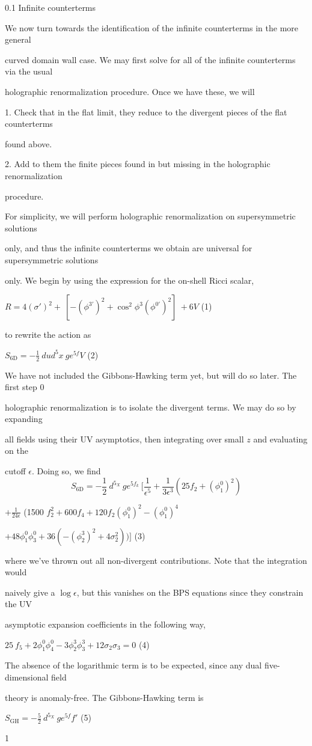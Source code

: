 \documentclass[a4paper,12pt]{article}
\begin{document}
0.1 Infinite counterterms

We now turn towards the identification of the infinite counterterms in the more general

curved domain wall case. We may first solve for all of the infinite counterterms via the usual

holographic renormalization procedure. Once we have these, we will

1. Check that in the flat limit, they reduce to the divergent pieces of the flat counterterms

found above.

2. Add to them the finite pieces found in but missing in the holographic renormalization

procedure.

For simplicity, we will perform holographic renormalization on supersymmetric solutions

only, and thus the infinite counterterms we obtain are universal for supersymmetric solutions

only. We begin by using the expression for the on-shell Ricci scalar,
\begin{center}
$R=4(\sigma')^{2}+\ [-(\phi^{3'})^{2}+\cos^{2}\phi^{3}(\phi^{0'})^{2}]\ +6V$   (1)
\end{center}
to rewrite the action as
\begin{center}
$S_{6\mathrm{D}}=-\displaystyle \frac{1}{2}\ dud^{5}x\ ge^{5f}V$   (2)
\end{center}
We have not included the Gibbons-Hawking term yet, but will do so later. The first step $0$

holographic renormalization is to isolate the divergent terms. We may do so by expanding

all fields using their UV asymptotics, then integrating over small $z$ and evaluating on the

cutoff $\epsilon$. Doing so, we find
$$
S_{6\mathrm{D}}=-\frac{1}{2}\ d^{5_{X}}\ ge^{5f_{k}}\ [\frac{1}{\epsilon^{5}}+\frac{1}{3\epsilon^{3}}(25f_{2}+(\phi_{1}^{0})^{2})
$$
\begin{center}
$+\displaystyle \frac{1}{24\epsilon}$ (1500 $f_{2}^{2}+600f_{4}+120f_{2}(\phi_{1}^{0})^{2}- (\phi_{1}^{0})^{4}$

$+48\phi_{1}^{0}\phi_{3}^{0}+36(-(\phi_{2}^{3})^{2}+4\sigma_{2}^{2}))]$   (3)
\end{center}
where we've thrown out all non-divergent contributions. Note that the integration would

naively give a $\log\epsilon$, but this vanishes on the BPS equations since they constrain the UV

asymptotic expansion coefficients in the following way,
\begin{center}
$25\ f_{5}+2\phi_{1}^{0}\phi_{4}^{0}-3\phi_{2}^{3}\phi_{3}^{3}+12\sigma_{2}\sigma_{3}=0$   (4)
\end{center}
The absence of the logarithmic term is to be expected, since any dual five-dimensional field

theory is anomaly-free. The Gibbons-Hawking term is
\begin{center}
$S_{\mathrm{G}\mathrm{H}}=-\displaystyle \frac{5}{2}\ d^{5_{X}}\ ge^{5f}f'$   (5)
\end{center}
1
\end{document}
